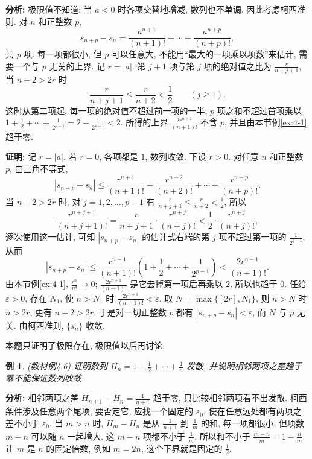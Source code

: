 \documentclass[UTF8,openany]{ctexbook}
\theoremstyle{chinesetextbook}
\newtheorem{example}{例}[section]
\newenvironment{cnproof}{\par\indent\textbf{证明:} \ignorespaces}{\par}
\begin{document}
\par\indent\textbf{分析:} 极限值不知道; 当 $a<0$ 时各项交替地增减, 数列也不单调. 因此考虑柯西准则. 对 $n$ 和正整数 $p$,
\[
s_{n+p}-s_n=\frac{a^{n+1}}{(n+1)!}+\cdots+\frac{a^{n+p}}{(n+p)!},
\]
共 $p$ 项. 每一项都很小, 但 $p$ 可以任意大, 不能用“最大的一项乘以项数”来估计, 需要一个与 $p$ 无关的上界. 记 $r=|a|$. 第 $j+1$ 项与第 $j$ 项的绝对值之比为 $\displaystyle\frac r{n+j+1}$, 当 $n+2>2r$ 时
\[
\frac r{n+j+1}\le\frac r{n+2}<\frac12\qquad(j\ge1).
\]
这时从第二项起, 每一项的绝对值不超过前一项的一半, $p$ 项之和不超过首项乘以 $\displaystyle1+\frac12+\cdots+\frac1{2^{p-1}}=2-\frac1{2^{p-1}}<2$. 所得的上界 $\displaystyle\frac{2r^{n+1}}{(n+1)!}$ 不含 $p$, 并且由本节例\ref{ex:4-1} 趋于零.
\begin{cnproof}
记 $r=|a|$. 若 $r=0$, 各项都是 $1$, 数列收敛. 下设 $r>0$. 对任意 $n$ 和正整数 $p$, 由三角不等式,
\[
|s_{n+p}-s_n|\le\frac{r^{n+1}}{(n+1)!}+\frac{r^{n+2}}{(n+2)!}+\cdots+\frac{r^{n+p}}{(n+p)!}.
\]
当 $n+2>2r$ 时, 对 $j=1,2,\ldots,p-1$ 有 $\displaystyle\frac r{n+j+1}\le\frac r{n+2}<\frac12$, 所以
\[
\frac{r^{n+j+1}}{(n+j+1)!}=\frac r{n+j+1}\cdot\frac{r^{n+j}}{(n+j)!}<\frac12\cdot\frac{r^{n+j}}{(n+j)!},
\]
逐次使用这一估计, 可知 $|s_{n+p}-s_n|$ 的估计式右端的第 $j$ 项不超过第一项的 $\displaystyle\frac1{2^{j-1}}$, 从而
\[
|s_{n+p}-s_n|\le\frac{r^{n+1}}{(n+1)!}\left(1+\frac12+\cdots+\frac1{2^{p-1}}\right)<\frac{2r^{n+1}}{(n+1)!}.
\]
由本节例\ref{ex:4-1}, $\displaystyle\frac{r^n}{n!}\to0$; $\displaystyle\frac{2r^{n+1}}{(n+1)!}$ 是它去掉第一项后再乘以 $2$, 所以也趋于 $0$. 任给 $\varepsilon>0$, 存在 $N_1$, 使 $n>N_1$ 时 $\displaystyle\frac{2r^{n+1}}{(n+1)!}<\varepsilon$. 取 $N=\max\{[2r],N_1\}$, 则 $n>N$ 时 $n>2r$, 更有 $n+2>2r$, 于是对一切正整数 $p$ 都有 $|s_{n+p}-s_n|<\varepsilon$, 而 $N$ 与 $p$ 无关. 由柯西准则, $\{s_n\}$ 收敛.
\end{cnproof}
本题只证明了极限存在, 极限值以后再讨论.
\begin{example}\label{ex:4-6}
\textnormal{(教材例4.6)} 证明数列 $\displaystyle H_n=1+\frac12+\cdots+\frac1n$ 发散, 并说明相邻两项之差趋于零不能保证数列收敛.
\end{example}
\par\indent\textbf{分析:} 相邻两项之差 $\displaystyle H_{n+1}-H_n=\frac1{n+1}$ 趋于零, 只比较相邻两项看不出发散. 柯西条件涉及任意两个尾项, 要否定它, 应找一个固定的 $\varepsilon_0$, 使在任意远处都有两项之差不小于 $\varepsilon_0$. 当 $m>n$ 时, $H_m-H_n$ 是从 $\displaystyle\frac1{n+1}$ 到 $\displaystyle\frac1m$ 的和, 每一项都很小, 但项数 $m-n$ 可以随 $n$ 一起增大. 这 $m-n$ 项都不小于 $\displaystyle\frac1m$, 所以和不小于 $\displaystyle\frac{m-n}m=1-\frac nm$. 让 $m$ 是 $n$ 的固定倍数, 例如 $m=2n$, 这个下界就是固定的 $\displaystyle\frac12$.
\end{document}
